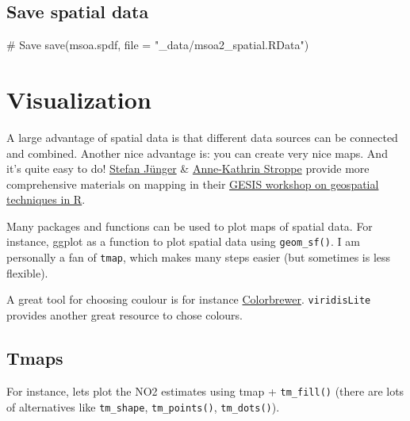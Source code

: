 \documentclass[
  letterpaper,
]{scrbook}
\newenvironment{Shaded}{\begin{snugshade}}{\end{snugshade}}
\newcommand{\AttributeTok}[1]{\textcolor[rgb]{0.40,0.45,0.13}{#1}}
\newcommand{\CommentTok}[1]{\textcolor[rgb]{0.37,0.37,0.37}{#1}}
\newcommand{\FunctionTok}[1]{\textcolor[rgb]{0.28,0.35,0.67}{#1}}
\newcommand{\NormalTok}[1]{\textcolor[rgb]{0.00,0.23,0.31}{#1}}
\newcommand{\StringTok}[1]{\textcolor[rgb]{0.13,0.47,0.30}{#1}}
\begin{document}
\hypertarget{save-spatial-data}{%
\subsection{Save spatial data}\label{save-spatial-data}}

\begin{Shaded}
\begin{Highlighting}[]
\CommentTok{\# Save}
\FunctionTok{save}\NormalTok{(msoa.spdf, }\AttributeTok{file =} \StringTok{"\_data/msoa2\_spatial.RData"}\NormalTok{)}
\end{Highlighting}
\end{Shaded}

\hypertarget{visualization}{%
\section{Visualization}\label{visualization}}

A large advantage of spatial data is that different data sources can be
connected and combined. Another nice advantage is: you can create very
nice maps. And it's quite easy to do!
\href{https://stefanjuenger.github.io/}{Stefan Jünger} \&
\href{https://www.gesis.org/institut/mitarbeitendenverzeichnis/person/Anne-Kathrin.Stroppe}{Anne-Kathrin
Stroppe} provide more comprehensive materials on mapping in their
\href{https://github.com/StefanJuenger/gesis-workshop-geospatial-techniques-R-2023}{GESIS
workshop on geospatial techniques in R}.

Many packages and functions can be used to plot maps of spatial data.
For instance, ggplot as a function to plot spatial data using
\texttt{geom\_sf()}. I am personally a fan of \texttt{tmap}, which makes
many steps easier (but sometimes is less flexible).

A great tool for choosing coulour is for instance
\href{https://colorbrewer2.org/}{Colorbrewer}. \texttt{viridisLite}
provides another great resource to chose colours.

\hypertarget{tmaps}{%
\subsection{Tmaps}\label{tmaps}}

For instance, lets plot the NO2 estimates using tmap +
\texttt{tm\_fill()} (there are lots of alternatives like
\texttt{tm\_shape}, \texttt{tm\_points()}, \texttt{tm\_dots()}).
\end{document}

